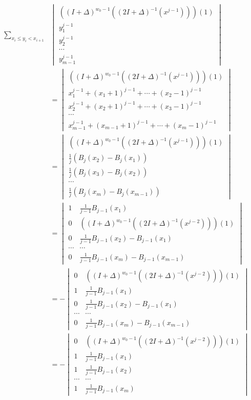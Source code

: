 \documentclass[10pt,reqno]{amsart}
\theoremstyle{plain}
\theoremstyle{definition}
\theoremstyle{remark}
\begin{document}
\begin{align}
\sum_{x_i\leq y_i<x_{i+1}} 
&\begin{vmatrix}
((I+\Delta)^{w_0-1} ((2I+\Delta)^{-1} (x^{j-1})))(1) \\
y_1^{j-1} \\
y_2^{j-1} \\
\dotsb \\
y_{m-1}^{j-1}
\end{vmatrix}\\ 
&=
\begin{vmatrix}
((I+\Delta)^{w_0-1} ((2I+\Delta)^{-1} (x^{j-1})))(1) \\
x_1^{j-1}+(x_1+1)^{j-1}+\dotsb + (x_2-1)^{j-1} \\
x_2^{j-1}+(x_2+1)^{j-1}+\dotsb + (x_3-1)^{j-1} \\
\dotsb \\
x_{m-1}^{j-1}+(x_{m-1}+1)^{j-1}+\dotsb + (x_m-1)^{j-1} 
\end{vmatrix} \\
&=  
\begin{vmatrix}
((I+\Delta)^{w_0-1} ((2I+\Delta)^{-1} (x^{j-1})))(1) \\
\frac{1}{j} (B_j(x_2) - B_j(x_1)) \\
\frac{1}{j} (B_j(x_3) - B_j(x_2)) \\
\dotsb \\
\frac{1}{j} (B_j(x_m) - B_j(x_{m-1}))
\end{vmatrix} \\
&=
\begin{vmatrix}
1 & \frac{1}{j-1} B_{j-1}(x_1)\\
0 & ((I+\Delta)^{w_0-1} ((2I+\Delta)^{-1} (x^{j-2})))(1) \\
0 & \frac{1}{j-1} B_{j-1}(x_2) - B_{j-1}(x_1)\\
\dotsb & \dotsb \\
0 & \frac{1}{j-1} B_{j-1}(x_m) - B_{j-1}(x_{m-1})
\end{vmatrix} \\
&=
- \begin{vmatrix}
0 & ((I+\Delta)^{w_0-1} ((2I+\Delta)^{-1} (x^{j-2})))(1) \\
1 & \frac{1}{j-1} B_{j-1}(x_1)\\
0 & \frac{1}{j-1} B_{j-1}(x_2) - B_{j-1}(x_1)\\
\dotsb & \dotsb \\
0 & \frac{1}{j-1} B_{j-1}(x_m) - B_{j-1}(x_{m-1})
\end{vmatrix} \\
&= 
- \begin{vmatrix}
0 & ((I+\Delta)^{w_0-1} ((2I+\Delta)^{-1} (x^{j-2})))(1) \\
1 & \frac{1}{j-1} B_{j-1}(x_1)\\
1 & \frac{1}{j-1} B_{j-1}(x_2)\\
\dotsb & \dotsb \\
1 & \frac{1}{j-1} B_{j-1}(x_m)
\end{vmatrix} 
\end{align}
\end{document}
